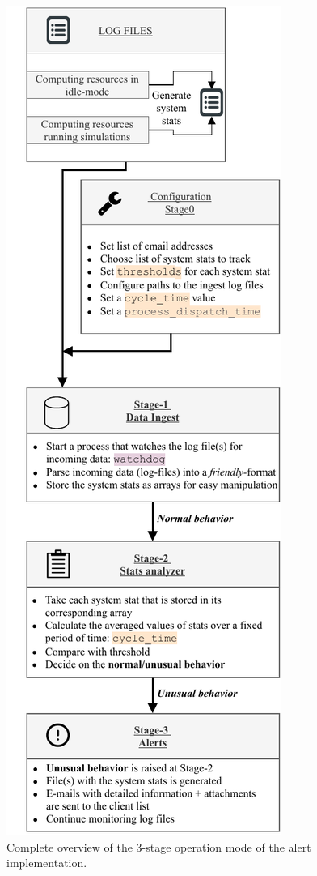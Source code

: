 \documentclass[conference]{IEEEtran}
\begin{document}
\begin{figure}[htbp]
    \centering
    \includegraphics[scale=0.95]{figs/alert_system_operation_mode_v2.pdf}
    \caption{Complete overview of the 3-stage operation mode of the alert implementation.}
    \label{fig-operation-mode}
\end{figure}
\end{document}
